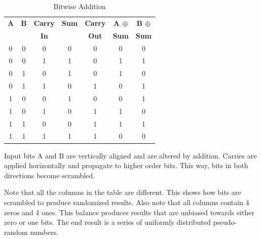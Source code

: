 \documentclass[preprint]{sigplanconf}
\begin{document}
\begin{table} [ht]
    \begin{center}
        \begin{tabular}{|c c c|c c|c c|}
            \hline
            \textbf{A} & \textbf{B} & \textbf{Carry} & \textbf{Sum} & \textbf{Carry} & \textbf{A $\oplus$} & \textbf{B $\oplus$} \\
                       &            & \textbf{In}    &              & \textbf{Out}   & \textbf{Sum}        & \textbf{Sum}        \\
            \hline
            0          & 0          & 0              & 0            & 0              & 0                   & 0                   \\
            0          & 0          & 1              & 1            & 0              & 1                   & 1                   \\
            0          & 1          & 0              & 1            & 0              & 1                   & 0                   \\
            0          & 1          & 1              & 0            & 1              & 0                   & 1                   \\
            1          & 0          & 0              & 1            & 0              & 0                   & 1                   \\
            1          & 0          & 1              & 0            & 1              & 1                   & 0                   \\
            1          & 1          & 0              & 0            & 1              & 1                   & 1                   \\
            1          & 1          & 1              & 1            & 1              & 0                   & 0                   \\
            \hline
        \end{tabular}
        \caption{Bitwise Addition}
        \label{table:bitwiseAddition}
    \end{center}
\end{table}

Input bits A and B are vertically aligned and are altered by addition. Carries are applied horizontally and propagate to higher order bits. This way, bits in both directions become scrambled.

Note that all the columns in the table are different. This shows how bits are scrambled to produce randomized results. Also note that all columns contain 4 zeros and 4 ones. This balance produces results that are unbiased towards either zero or one bits. The end result is a series of uniformly distributed pseudo-random numbers.
\end{document}

